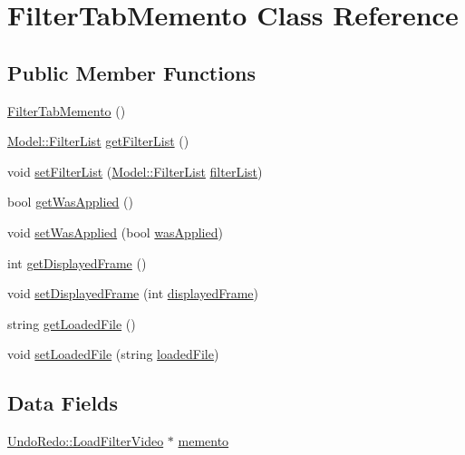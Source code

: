 \hypertarget{classMemento_1_1FilterTabMemento}{}\section{Filter\+Tab\+Memento Class Reference}
\label{classMemento_1_1FilterTabMemento}
\subsection*{Public Member Functions}
\begin{DoxyCompactItemize}
\item 
\hyperlink{classMemento_1_1FilterTabMemento_a84a5fcbb2f69b5b3c57dae3540fdd40b}{Filter\+Tab\+Memento} ()
\item 
\hyperlink{classModel_1_1FilterList}{Model\+::\+Filter\+List} \hyperlink{classMemento_1_1FilterTabMemento_aeb90f44d68b79c38d2c002f7287924bf}{get\+Filter\+List} ()
\item 
void \hyperlink{classMemento_1_1FilterTabMemento_a496e5beca03e3f576c23e307e1aef580}{set\+Filter\+List} (\hyperlink{classModel_1_1FilterList}{Model\+::\+Filter\+List} \hyperlink{classMemento_1_1FilterTabMemento_a8b8a3ba5ed91024c3fae034e79ac9b98}{filter\+List})
\item 
bool \hyperlink{classMemento_1_1FilterTabMemento_aece4e0d122e3afae0c4173edba6a4cc8}{get\+Was\+Applied} ()
\item 
void \hyperlink{classMemento_1_1FilterTabMemento_a635ac39ad3547885c6d8a5f631a86aeb}{set\+Was\+Applied} (bool \hyperlink{classMemento_1_1FilterTabMemento_a43e9c83a8de0c1ba3fe1eeb2d79ce143}{was\+Applied})
\item 
int \hyperlink{classMemento_1_1FilterTabMemento_a116429d102ca02253915c78f76d305d2}{get\+Displayed\+Frame} ()
\item 
void \hyperlink{classMemento_1_1FilterTabMemento_ad3eeeb568c249bd940edc513b0697cd8}{set\+Displayed\+Frame} (int \hyperlink{classMemento_1_1FilterTabMemento_ae4b630ac2d832b4a6f881a5ba6a67948}{displayed\+Frame})
\item 
string \hyperlink{classMemento_1_1FilterTabMemento_aef6a8daef5ed9e5ac0862ef4323f3f8d}{get\+Loaded\+File} ()
\item 
void \hyperlink{classMemento_1_1FilterTabMemento_a2dc9fb31a997a0f4d76aa4b6d11c12c9}{set\+Loaded\+File} (string \hyperlink{classMemento_1_1FilterTabMemento_a92c868536288b60d5332815c5453f58f}{loaded\+File})
\end{DoxyCompactItemize}
\subsection*{Data Fields}
\begin{DoxyCompactItemize}
\item 
\hyperlink{classUndoRedo_1_1LoadFilterVideo}{Undo\+Redo\+::\+Load\+Filter\+Video} $\ast$ \hyperlink{classMemento_1_1FilterTabMemento_a716369548c922081dc92d740a92f6314}{memento}
\end{DoxyCompactItemize}
